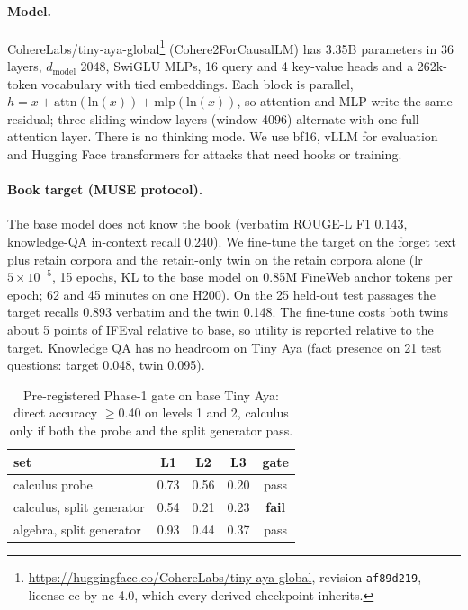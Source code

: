 \documentclass[10pt,twocolumn,letterpaper]{article}
\begin{document}
\paragraph{Model.} CohereLabs/tiny-aya-global\footnote{\url{https://huggingface.co/CohereLabs/tiny-aya-global}, revision
\texttt{af89d219}, license cc-by-nc-4.0, which every derived checkpoint inherits.} (Cohere2ForCausalLM) has 3.35B
parameters in 36 layers, $d_\text{model}$ 2048, SwiGLU MLPs, 16 query and 4 key-value heads and a 262k-token vocabulary
with tied embeddings. Each block is parallel, $h = x + \mathrm{attn}(\mathrm{ln}(x)) + \mathrm{mlp}(\mathrm{ln}(x))$,
so attention and MLP write the same residual; three sliding-window layers (window 4096) alternate with one full-attention
layer. There is no thinking mode. We use bf16, vLLM for evaluation and Hugging Face transformers for attacks that need
hooks or training.

\paragraph{Book target (MUSE protocol).} The base model does not know the book (verbatim ROUGE-L F1 0.143,
knowledge-QA in-context recall 0.240). We fine-tune the target on the forget text plus retain corpora and the retain-only
twin on the retain corpora alone (lr $5\times10^{-5}$, 15 epochs, KL to the base model on 0.85M FineWeb anchor tokens per
epoch; 62 and 45 minutes on one H200). On the 25 held-out test passages the target recalls 0.893 verbatim and the twin
0.148. The fine-tune costs both twins about 5 points of IFEval relative to base, so utility is reported relative to the
target. Knowledge QA has no headroom on Tiny Aya (fact presence on 21 test questions: target 0.048, twin 0.095).

\begin{table}[t]
\centering\small
\caption{Pre-registered Phase-1 gate on base Tiny Aya: direct accuracy $\ge$0.40 on levels 1 and 2, calculus only if both
the probe and the split generator pass.}
\label{tab:gate}
\begin{tabular}{@{}lcccc@{}}
\toprule
set & L1 & L2 & L3 & gate \\
\midrule
calculus probe & 0.73 & 0.56 & 0.20 & pass \\
calculus, split generator & 0.54 & 0.21 & 0.23 & \textbf{fail} \\
algebra, split generator & 0.93 & 0.44 & 0.37 & pass \\
\bottomrule
\end{tabular}
\end{table}
\end{document}

